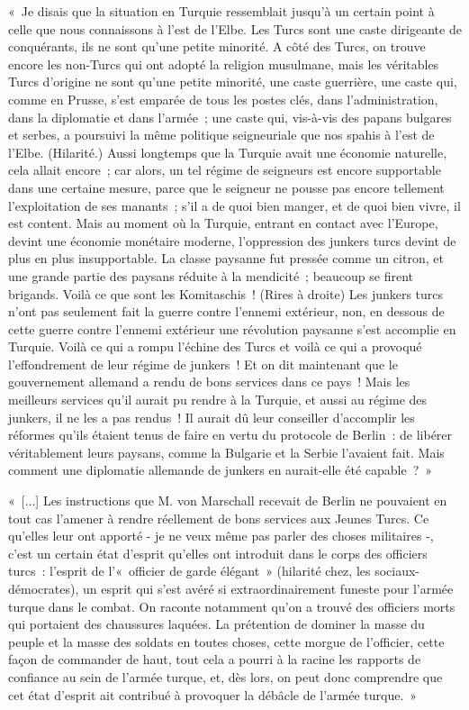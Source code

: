 \documentclass[french,twoside]{book} %
\begin{document}
{ « Je disais que la situation en Turquie ressemblait jusqu’à un certain point à celle que nous connaissons à l’est de l’Elbe. Les Turcs sont une caste dirigeante de conquérants, ils ne sont qu’une petite minorité. A côté des Turcs, on trouve encore les non-Turcs qui ont adopté la religion musulmane, mais les véritables Turcs d’origine ne sont qu’une petite minorité, une caste guerrière, une caste qui, comme en Prusse, s’est emparée de tous les postes clés, dans l’administration, dans la diplomatie et dans l’armée ; une caste qui, vis-à-vis des papans bulgares et serbes, a poursuivi la même politique seigneuriale que nos spahis à l’est de l’Elbe. (Hilarité.) Aussi longtemps que la Turquie avait une économie naturelle, cela allait encore ; car alors, un tel régime de seigneurs est encore supportable dans une certaine mesure, parce que le seigneur ne pousse pas encore tellement l’exploitation de ses manants ; s’il a de quoi bien manger, et de quoi bien vivre, il est content. Mais au moment où la Turquie, entrant en contact avec l’Europe, devint une économie monétaire moderne, l’oppression des junkers turcs devint de plus en plus insupportable. La classe paysanne fut pressée comme un citron, et une grande partie des paysans réduite à la mendicité ; beaucoup se firent brigands. Voilà ce que sont les Komitaschis ! (Rires à droite) Les junkers turcs n’ont pas seulement fait la guerre contre l’ennemi extérieur, non, en dessous de cette guerre contre l’ennemi extérieur une révolution paysanne s’est accomplie en Turquie. Voilà ce qui a rompu l’échine des Turcs et voilà ce qui a provoqué l’effondrement de leur régime de junkers ! Et on dit maintenant que le gouvernement allemand a rendu de bons services dans ce pays ! Mais les meilleurs services qu’il aurait pu rendre à la Turquie, et aussi au régime des junkers, il ne les a pas rendus ! Il aurait dû leur conseiller d’accomplir les réformes qu’ils étaient tenus de faire en vertu du protocole de Berlin : de libérer véritablement leurs paysans, comme la Bulgarie et la Serbie l’avaient fait. Mais comment une diplomatie allemande de junkers en aurait-elle été capable ? »\par
 « [...] Les instructions que M. von Marschall recevait de Berlin ne pouvaient en tout cas l’amener à rendre réellement de bons services aux Jeunes Turcs. Ce qu’elles leur ont apporté - je ne veux même pas parler des choses militaires -, c’est un certain état d’esprit qu’elles ont introduit dans le corps des officiers turcs : l’esprit de l’« officier de garde élégant » (hilarité chez, les sociaux-démocrates), un esprit qui s’est avéré si extraordinairement funeste pour l’armée turque dans le combat. On raconte notamment qu’on a trouvé des officiers morts qui portaient des chaussures laquées. La prétention de dominer la masse du peuple et la masse des soldats en toutes choses, cette morgue de l’officier, cette façon de commander de haut, tout cela a pourri à la racine les rapports de confiance au sein de l’armée turque, et, dès lors, on peut donc comprendre que cet état d’esprit ait contribué à provoquer la débâcle de l’armée turque. »\par
}
\end{document}
